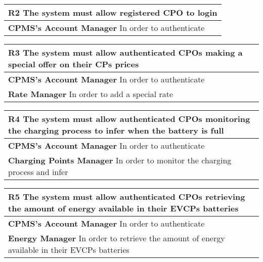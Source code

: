 \begin{table}[H]
    \begin{tabularx}{\textwidth}{X}
        \toprule
        \textbf{R2} The system must allow registered CPO to login \\ \midrule
        \textbf{CPMS's Account Manager}  In order to authenticate \\
    \end{tabularx}
\end{table}
\begin{table}[H]
    \begin{tabularx}{\textwidth}{X}
        \toprule
        \textbf{R3} The system must allow authenticated CPOs making a special offer on their CPs prices \\ \midrule
        \textbf{CPMS's Account Manager}   In order to authenticate                                      \\
        \textbf{Rate Manager}  In order to add a special rate                                           \\
    \end{tabularx}
\end{table}
\begin{table}[H]
    \begin{tabularx}{\textwidth}{X}
        \toprule
        \textbf{R4} The system must allow authenticated CPOs monitoring the charging process to infer when the battery is full \\ \midrule
        \textbf{CPMS's Account Manager}  In order to authenticate                                                              \\
        \textbf{Charging Points Manager} In order to monitor the charging process and infer                                    \\
    \end{tabularx}
\end{table}
\begin{table}[H]
    \begin{tabularx}{\textwidth}{X}
        \toprule
        \textbf{R5} The system must allow authenticated CPOs retrieving the amount of energy
        available in their EVCPs batteries                                                                    \\ \midrule
        \textbf{CPMS's Account Manager}  In order to authenticate                                             \\
        \textbf{Energy Manager}  In order to retrieve the amount of energy available in their EVCPs batteries \\
    \end{tabularx}
\end{table}
